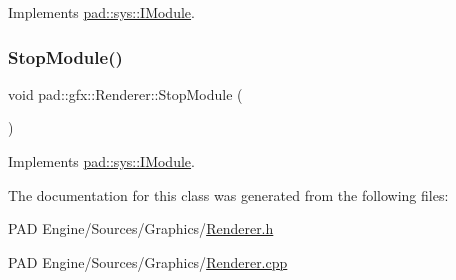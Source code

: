 Implements \mbox{\hyperlink{classpad_1_1sys_1_1_i_module_ad3d5abf3e4d20047b6b64da7db92d1ef}{pad\+::sys\+::\+I\+Module}}.

\mbox{\label{classpad_1_1gfx_1_1_renderer_ad90dc994132b8f4028eaa5b9af87b601}} 
\subsubsection{\texorpdfstring{Stop\+Module()}{StopModule()}}
{\footnotesize\ttfamily void pad\+::gfx\+::\+Renderer\+::\+Stop\+Module (\begin{DoxyParamCaption}{ }\end{DoxyParamCaption})\hspace{0.3cm}{\ttfamily [virtual]}}



Implements \mbox{\hyperlink{classpad_1_1sys_1_1_i_module_aa6c2b9d1e6b66aeee291923d4be87f0c}{pad\+::sys\+::\+I\+Module}}.



The documentation for this class was generated from the following files\+:\begin{DoxyCompactItemize}
\item 
P\+A\+D Engine/\+Sources/\+Graphics/\mbox{\hyperlink{_renderer_8h}{Renderer.\+h}}\item 
P\+A\+D Engine/\+Sources/\+Graphics/\mbox{\hyperlink{_renderer_8cpp}{Renderer.\+cpp}}\end{DoxyCompactItemize}
